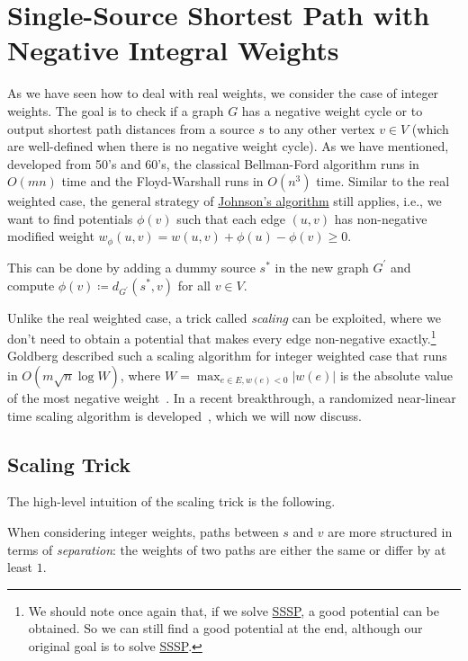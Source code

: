 \section{Single-Source Shortest Path with Negative Integral Weights}
As we have seen how to deal with real weights, we consider the case of integer weights. The goal is to check if a graph \(G\) has a negative weight cycle or to output shortest path distances from a source \(s\) to any other vertex \(v \in V\) (which are well-defined when there is no negative weight cycle). As we have mentioned, developed from 50's and 60's, the classical Bellman-Ford algorithm runs in \(O(mn)\) time and the Floyd-Warshall runs in \(O(n^3)\) time. Similar to the real weighted case, the general strategy of \hyperref[prev:Johnson-algorithm]{Johnson's algorithm} still applies, i.e., we want to find potentials \(\phi (v)\) such that each edge \((u, v)\) has non-negative modified weight \(w_{\phi }(u, v) = w(u, v) + \phi (u) - \phi (v) \geq 0\).

\begin{prev}
	This can be done by adding a dummy source \(s^{\ast} \) in the new graph \(G^{\prime} \) and compute \(\phi (v) \coloneqq d_{G^{\prime} }(s^{\ast} , v)\) for all \(v \in V\).
\end{prev}

Unlike the real weighted case, a trick called \emph{scaling} can be exploited, where we don't need to obtain a potential that makes every edge non-negative exactly.\footnote{We should note once again that, if we solve \hyperref[prb:SSSP]{SSSP}, a good potential can be obtained. So we can still find a good potential at the end, although our original goal is to solve \hyperref[prb:SSSP]{SSSP}.} Goldberg described such a scaling algorithm for integer weighted case that runs in \(O(m \sqrt{n} \log W)\), where \(W = \max _{e \in E, w(e) < 0} \lvert w(e) \rvert \) is the absolute value of the most negative weight~\cite{goldberg1995scaling}. In a recent breakthrough, a randomized near-linear time scaling algorithm is developed~\cite{bernstein2022negative,bringmann2023negative}, which we will now discuss.

\subsection{Scaling Trick}
The high-level intuition of the scaling trick is the following.

\begin{intuition}[Scaling]
	When considering integer weights, paths between \(s\) and \(v\) are more structured in terms of \emph{separation}: the weights of two paths are either the same or differ by at least \(1\).
\end{intuition}

